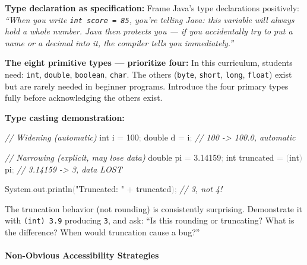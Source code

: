 \documentclass[
  justified,
  openright,
]{tufte-book}
\let\paragraph\paragraph
\newcommand{\StringTok}[1]{\textcolor{CodeString}{#1}}              %
\newcommand{\CommentTok}[1]{\textcolor{CodeComment}{\textit{#1}}}  %
\newcommand{\CodeNumTok}[1]{\textcolor{CodeNumber}{#1}}             %
\newcommand{\CodeFuncTok}[1]{\textcolor{CodeKeyword}{#1}}           %
\newcommand{\CodeTypeTok}[1]{\textcolor{CodeType}{#1}}              %
\newcommand{\OperatorTok}[1]{\textcolor{DarkGray}{#1}}              %
\newenvironment{Shaded}{%
  \begin{mdframed}[style=TufteCode]%
}{%
  \end{mdframed}%
}
\let\paragraph\paragraph
\begin{document}
\textbf{Type declaration as specification:} Frame Java's type
declarations positively: \emph{``When you write
\texttt{int\ score\ =\ 85}, you're telling Java: this variable will
always hold a whole number. Java then protects you --- if you
accidentally try to put a name or a decimal into it, the compiler tells
you immediately.''}

\textbf{The eight primitive types --- prioritize four:} In this
curriculum, students need: \texttt{int}, \texttt{double},
\texttt{boolean}, \texttt{char}. The others (\texttt{byte},
\texttt{short}, \texttt{long}, \texttt{float}) exist but are rarely
needed in beginner programs. Introduce the four primary types fully
before acknowledging the others exist.

\textbf{Type casting demonstration:}

\begin{Shaded}
\begin{Highlighting}[]
\CommentTok{// Widening (automatic)}
\CodeTypeTok{int} i \OperatorTok{=} \CodeNumTok{100}\OperatorTok{;}
\CodeTypeTok{double} d \OperatorTok{=} i\OperatorTok{;}   \CommentTok{// 100 {-}\textgreater{} 100.0, automatic}
 
\CommentTok{// Narrowing (explicit, may lose data)}
\CodeTypeTok{double} pi \OperatorTok{=} \CodeNumTok{3.14159}\OperatorTok{;}
\CodeTypeTok{int} truncated \OperatorTok{=} \OperatorTok{(}\CodeTypeTok{int}\OperatorTok{)} pi\OperatorTok{;}  \CommentTok{// 3.14159 {-}\textgreater{} 3, data LOST}
 
System\OperatorTok{.}\CodeFuncTok{out}\OperatorTok{.}\CodeFuncTok{println}\OperatorTok{(}\StringTok{"Truncated: "} \OperatorTok{+} truncated\OperatorTok{);}  \CommentTok{// 3, not 4!}
\end{Highlighting}
\end{Shaded}

The truncation behavior (not rounding) is consistently surprising.
Demonstrate it with \texttt{(int)\ 3.9} producing \texttt{3}, and ask:
``Is this rounding or truncating? What is the difference? When would
truncation cause a bug?''

\paragraph{Non-Obvious Accessibility
Strategies}\label{non-obvious-accessibility-strategies-4}
\end{document}

